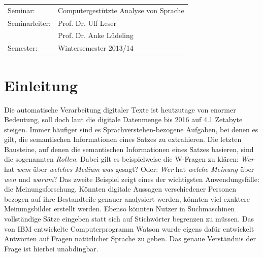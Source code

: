 \documentclass[12pt]{article}
\begin{document}
\begin{center}
\begin{Large}
		\begin{table}[h]
			\Large
			\centering
			\begin{tabular}{l l}
				Seminar: & Computergestützte Analyse von Sprache\\
				Seminarleiter: & Prof. Dr. Ulf Leser\\
				 		    & Prof. Dr. Anke Lüdeling \\
				Semester: & Wintersemester 2013/14 				 	
			\end{tabular}
		\end{table}	
	\end{Large}
\end{center}


\pagestyle{fancy} %
\fancyhf{} %
\renewcommand{\headrulewidth}{0pt} %
\renewcommand{\footrulewidth}{0pt} %
\fancyfoot[C]{\thepage} %

 \newpage
 \tableofcontents
 \vspace{0.5cm}
 \listoffigures
 \vspace{0.5cm}
 \listoftables

\newpage
{}

\section{Einleitung}

Die automatische Verarbeitung digitaler Texte ist heutzutage von enormer Bedeutung, soll doch laut \cite{gartner} die digitale Datenmenge bis 2016 auf 4.1 Zetabyte steigen. Immer häufiger sind es Sprachverstehen-bezogene Aufgaben, bei denen es gilt, die semantischen Informationen eines Satzes zu extrahieren. Die letzten Bausteine, auf denen die semantischen Informationen eines Satzes basieren, sind die sogenannten \textit{Rollen}. Dabei gilt es beispielweise die \glqq{}W\grqq{}-Fragen zu klären: \textit{Wer} hat \textit{wem} über \textit{welches Medium} \textit{was} gesagt? Oder: \textit{Wer} hat \textit{welche Meinung} über \textit{wen} und \textit{warum}? Das zweite Beispiel zeigt eines der wichtigsten Anwendungsfälle: die Meinungsforschung. Könnten digitale Aussagen verschiedener Personen bezogen auf ihre Bestandteile genauer analysiert werden, könnten viel exaktere Meinungsbilder erstellt werden. Ebenso könnten Nutzer in Suchmaschinen vollständige Sätze eingeben statt sich auf Stichwörter begrenzen zu müssen. Das von IBM entwickelte Computerprogramm Watson \citep{ibmWatson} wurde eigens dafür entwickelt Antworten auf Fragen natürlicher Sprache zu geben. Das genaue Verständnis der Frage ist hierbei unabdingbar.
\end{document}
